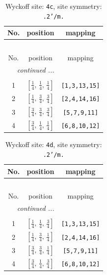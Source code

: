 \documentclass[fleqn,8pt]{jsarticle}
\begin{document}
\renewcommand{\arraystretch}{1.2}
\begin{longtable}{ccc}
\caption{Wyckoff site: {\tt 4c}, site symmetry: {\tt .2'/m.}}
 \\
 \hline \hline
No. & position & mapping \\ \hline \endfirsthead

\multicolumn{2}{l}{\tablename\ \thetable{}} \\
 \hline \hline
No. & position & mapping \\ \hline \endhead

 \hline \hline
\multicolumn{2}{r}{\footnotesize\it continued ...} \\ \endfoot

 \hline \hline
\multicolumn{2}{r}{} \\ \endlastfoot

1 & $\left[ \frac{1}{4},\, \frac{1}{4},\, \frac{1}{4} \right]$ & {\tt [1,3,13,15]} \\ \hline
2 & $\left[ \frac{1}{4},\, \frac{3}{4},\, \frac{3}{4} \right]$ & {\tt [2,4,14,16]} \\ \hline
3 & $\left[ \frac{3}{4},\, \frac{3}{4},\, \frac{3}{4} \right]$ & {\tt [5,7,9,11]} \\ \hline
4 & $\left[ \frac{3}{4},\, \frac{1}{4},\, \frac{1}{4} \right]$ & {\tt [6,8,10,12]} \\
\end{longtable}
\renewcommand{\arraystretch}{1.2}
\begin{longtable}{ccc}
\caption{Wyckoff site: {\tt 4d}, site symmetry: {\tt .2'/m.}}
 \\
 \hline \hline
No. & position & mapping \\ \hline \endfirsthead

\multicolumn{2}{l}{\tablename\ \thetable{}} \\
 \hline \hline
No. & position & mapping \\ \hline \endhead

 \hline \hline
\multicolumn{2}{r}{\footnotesize\it continued ...} \\ \endfoot

 \hline \hline
\multicolumn{2}{r}{} \\ \endlastfoot

1 & $\left[ \frac{1}{4},\, \frac{1}{4},\, \frac{3}{4} \right]$ & {\tt [1,3,13,15]} \\ \hline
2 & $\left[ \frac{1}{4},\, \frac{3}{4},\, \frac{1}{4} \right]$ & {\tt [2,4,14,16]} \\ \hline
3 & $\left[ \frac{3}{4},\, \frac{3}{4},\, \frac{1}{4} \right]$ & {\tt [5,7,9,11]} \\ \hline
4 & $\left[ \frac{3}{4},\, \frac{1}{4},\, \frac{3}{4} \right]$ & {\tt [6,8,10,12]} \\
\end{longtable}
\end{document}
